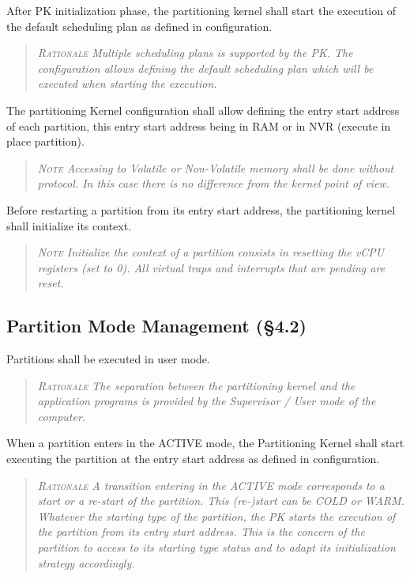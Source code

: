 After PK initialization phase, the partitioning kernel shall start the execution of the default scheduling plan as defined in configuration.
\begin{quote}\it
\textsc{Rationale}
Multiple scheduling plans is supported by the PK. The configuration allows defining the default scheduling plan which will be executed when starting the execution.
\end{quote}

The partitioning Kernel configuration shall allow defining the entry start address of each partition, this entry start address being in RAM or in NVR (execute in place partition).
\begin{quote}\it
\textsc{Note}
Accessing to Volatile or Non-Volatile memory shall be done without protocol. In this case there is no difference from the kernel point of view.
\end{quote}

Before restarting a partition from its entry start address, the partitioning kernel shall initialize its context.
\begin{quote}\it
\textsc{Note}
Initialize the context of a partition consists in resetting the vCPU registers (set to 0). All virtual traps and interrupts that are pending are reset.
\end{quote}

\subsection{Partition Mode Management (\S4.2)}

Partitions shall be executed in user mode.
\begin{quote}\it
\textsc{Rationale}
The separation between the partitioning kernel and the application programs is provided by the Supervisor / User mode of the computer.
\end{quote}

When a partition enters in the ACTIVE mode, the Partitioning Kernel shall start executing the partition at the entry start address as defined in configuration.
\begin{quote}\it
\textsc{Rationale}
A transition entering in the ACTIVE mode corresponds to a start or a re-start of the partition. This (re-)start can be COLD or WARM. Whatever the starting type of the partition, the PK starts the execution of the partition from its entry start address. This is the concern of the partition to access to its starting type status and to adapt its initialization strategy accordingly.
\end{quote}

